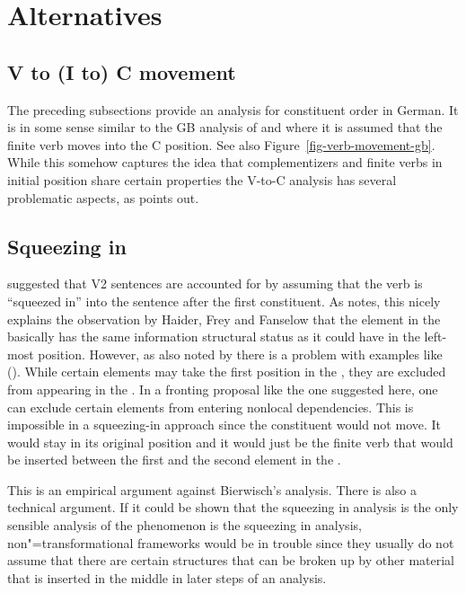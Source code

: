 {{\section{Alternatives}

\subsection{V to (I to) C movement}
\label{sec-v-to-c-movement}

The preceding subsections provide an analysis for constituent order in German. It is in some sense
similar to the GB analysis of \citep[Chapter~1]{Thiersch78a} and \citep{denBesten} where it is assumed that the
finite verb moves into the C position. See also Figure~\vref{fig-verb-movement-gb}. While this
somehow captures the idea that complementizers and finite verbs in initial position share certain
properties \citep{Hoehle97a} the V-to-C analysis has several problematic aspects, as
\citet{Fanselow2009a} points out.



\subsection{Squeezing in}

\citet[]{Bierwisch63} suggested that V2 sentences are accounted for by assuming that the verb
is ``squeezed in'' into the sentence after the first constituent. As \citet{Fanselow2009a} notes,
this nicely explains the observation by Haider, Frey and Fanselow that the
element in the \vf basically has the same information structural status as it could have in the
left-most \mf position. However, as also noted by \citet{Fanselow2009b} there is a problem with
examples like (). While certain elements may take the first position in the \mf, they are
excluded from appearing in the \vf.
\eal
\ex
\zl
In a fronting proposal like the one suggested here, one can exclude certain elements from entering
nonlocal dependencies. This is impossible in a squeezing-in approach since the \mf constituent would
not move. It would stay in its original position and it would just be the finite verb that would be
inserted between the first and the second element in the \mf.

This is an empirical argument against Bierwisch's analysis. There is also a technical argument. If
it could be shown that the squeezing in analysis is the only sensible analysis of the phenomenon is
the squeezing in analysis, non"=transformational frameworks would be in trouble since they usually do
not assume that there are certain structures that can be broken up by other material that is
inserted in the middle in later steps of an analysis.

}}
